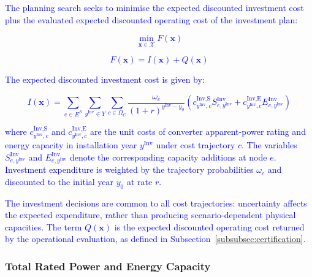 \documentclass[preprint,12pt]{elsarticle}
\begin{document}
\textcolor{blue}{The planning search seeks to minimise the expected discounted investment cost plus the evaluated expected discounted operating cost of the investment plan:}

\textcolor{blue}{
    \begin{equation}
        \min_{\boldsymbol{x}\in\mathcal{X}} F(\boldsymbol{x})
        \label{eq:master_objective}
    \end{equation}
}

\textcolor{blue}{
    \begin{equation}
        F(\boldsymbol{x}) = I(\boldsymbol{x}) + Q(\boldsymbol{x})
        \label{eq:master_objective_value}
    \end{equation}
}

\textcolor{blue}{
    The expected discounted investment cost is given by:
}

\textcolor{blue}{
    \begin{equation}
        I(\boldsymbol{x}) = \sum_{e\in E^S} \sum_{y^{\text{Inv}}\in Y} \sum_{c\in\Omega_C} \frac{\omega_c}{(1+r)^{y^{\text{Inv}}-y_0}}
        \left(
            c^{\text{Inv,S}}_{y^{\text{Inv}},c} S^{\text{Inv}}_{e,y^{\text{Inv}}}
            +
            c^{\text{Inv,E}}_{y^{\text{Inv}},c} E^{\text{Inv}}_{e,y^{\text{Inv}}}
        \right)
    \end{equation}
}

\noindent
\textcolor{blue}{
    where $c^{\text{Inv,S}}_{y^{\text{Inv}},c}$ and $c^{\text{Inv,E}}_{y^{\text{Inv}},c}$ are the unit costs of converter apparent-power rating and energy capacity in installation year $y^{\text{Inv}}$ under cost trajectory $c$.
    The variables $S^{\text{Inv}}_{e,y^{\text{Inv}}}$ and $E^{\text{Inv}}_{e,y^{\text{Inv}}}$ denote the corresponding capacity additions at node $e$. Investment expenditure is weighted by the trajectory probabilities $\omega_c$ and discounted to the initial year $y_0$ at rate $r$.
}

\textcolor{blue}{
    The investment decisions are common to all cost trajectories: uncertainty affects the expected expenditure, rather than producing scenario-dependent physical capacities.
    The term $Q(\boldsymbol{x})$ is the expected discounted operating cost returned by the operational evaluation, as defined in Subsection~\ref{subsubsec:certification}.
}

\subsubsection{Total Rated Power and Energy Capacity}
\end{document}
